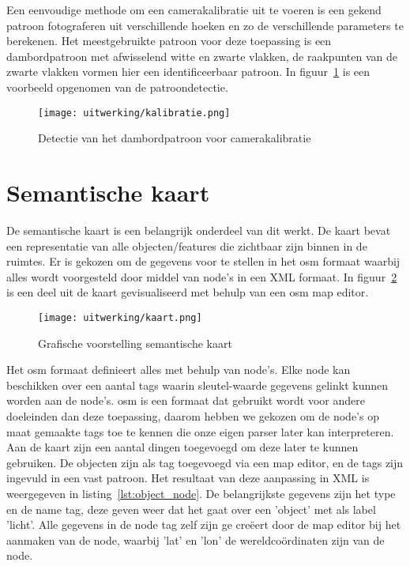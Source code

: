 Een eenvoudige methode om een camerakalibratie uit te voeren is een gekend patroon fotograferen uit verschillende hoeken en zo de verschillende parameters te berekenen.
Het meestgebruikte patroon voor deze toepassing is een dambordpatroon met afwisselend witte en zwarte vlakken, de raakpunten van de zwarte vlakken vormen hier een
identificeerbaar patroon. In figuur~\ref{fig:kalibratie} is een voorbeeld opgenomen van de patroondetectie.

\begin{figure}[!hb]
    \centering
    \texttt{[image: uitwerking/kalibratie.png]}
    \caption{Detectie van het dambordpatroon voor camerakalibratie}
    \label{fig:kalibratie}
\end{figure}


\section{Semantische kaart}\label{sec:sem_kaart}
De semantische kaart is een belangrijk onderdeel van dit werkt.
De kaart bevat een representatie van alle objecten/features die zichtbaar zijn binnen in de ruimtes.
Er is gekozen om de gegevens voor te stellen in het \gls{osm} formaat waarbij alles wordt voorgesteld door middel van node's in een XML formaat.
In figuur~\ref{fig:kaart} is een deel uit de kaart gevisualiseerd met behulp van een \gls{osm} map editor.

\begin{figure}
    \centering
    \texttt{[image: uitwerking/kaart.png]}
    \caption{Grafische voorstelling semantische kaart}
    \label{fig:kaart}
\end{figure}

Het \gls{osm} formaat definieert alles met behulp van node's. Elke node kan beschikken over een aantal tags waarin sleutel-waarde gegevens gelinkt kunnen worden aan de node's.
\gls{osm} is een formaat dat gebruikt wordt voor andere doeleinden dan deze toepassing, daarom hebben we gekozen om de node's op maat gemaakte tags toe te kennen
die onze eigen parser later kan interpreteren.
Aan de kaart zijn een aantal dingen toegevoegd om deze later te kunnen gebruiken.
De objecten zijn als tag toegevoegd via een map editor, en de tags zijn ingevuld in een vast patroon. Het resultaat van deze aanpassing in XML is weergegeven in listing~\ref{lst:object_node}.
De belangrijkste gegevens zijn het type en de name tag, deze geven weer dat het gaat over een 'object' met als label 'licht'.
Alle gegevens in de node tag zelf zijn ge cre\"{e}ert door de map editor bij het aanmaken van de node, waarbij 'lat' en 'lon' de wereldco\"{o}rdinaten zijn van de node.

